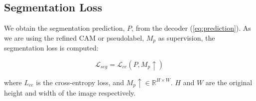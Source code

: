 \subsection{Segmentation Loss}
\label{seg_loss}
We obtain the segmentation prediction, $P$, from the decoder (\autoref{eq:prediction}). As we are using the refined CAM or pseudolabel, $M_p$ as supervision, the segmentation loss is computed:

\begin{equation}
    \mathcal{L}_{seg} = \mathcal{L}_{ce}(P, M_p \uparrow)
\end{equation}

where \( L_{ce} \) is the cross-entropy loss, and \( M_p{\uparrow} \in \mathbb{R}^{H \times W} \). $H$ and $W$ are the original height and width of the image respectively.


